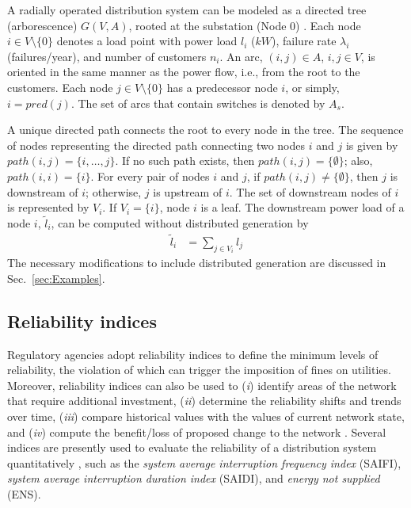 A radially operated distribution system can be modeled as a directed tree (arborescence) $G(V,A)$, rooted at the substation (Node $0$) \cite{ahuja93}. Each node $i \in V \setminus \{0\}$ denotes a load point with power load $l_i$ ($kW$), failure rate $\lambda_i$ (failures/year), and number of customers $n_i$. An arc, $(i,j) \in A$, $i,j \in V$, is oriented in the same manner as the power flow, i.e., from the root to the customers. Each node $j \in V \setminus \{ 0 \}$ has a predecessor node $i$, or simply, $i=pred(j)$. The set of arcs that contain switches is denoted by $A_{s}$.

A unique directed path connects the root to every node in the tree. The sequence of nodes representing the directed path connecting two nodes $i$ and $j$ is given by $path(i,j) = \{i, \ldots, j\}$. If no such path exists, then $path(i,j) = \{\emptyset\}$; also, $path(i,i) = \{i\}$. For every pair of nodes $i$ and $j$, if $path(i,j) \neq \{\emptyset\}$, then $j$ is downstream of $i$; otherwise, $j$ is upstream of $i$.
The set of downstream nodes of $i$ is represented by $V_i$. If $V_i = \{i\}$, node $i$ is a leaf. The downstream power load of a node $i$, $\tilde{l}_i$, can be computed without distributed generation by
\begin{align} 
 \displaystyle
 \tilde{l}_i &= \sum_{j \in V_i}{l_j} \label{eq:tildepi}
\end{align}
The necessary  modifications to include distributed generation are discussed in Sec.~\ref{sec:Examples}.


\subsection{Reliability indices} \label{sec:indices}

Regulatory agencies adopt reliability indices to define the minimum levels of reliability, the violation of which can trigger the imposition of fines on utilities. Moreover, reliability indices can also be used to (\textit{i}) identify areas of the network that require additional investment, (\textit{ii}) determine the reliability shifts and trends over time, (\textit{iii}) compare historical values with the values of current network state, and (\textit{iv}) compute the benefit/loss of proposed change to the network \cite{brown2008}.
Several indices are presently used to evaluate  the reliability of a distribution system quantitatively \cite{billinton}, such as the \textit{system average interruption frequency index} (SAIFI), \textit{system average interruption duration index} (SAIDI), and \textit{energy not supplied} (ENS). 


